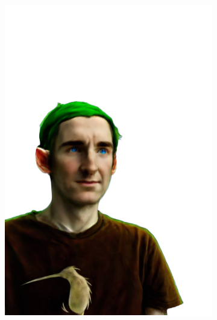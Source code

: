 \begin{figure}[ht]
\begin{subfigure}{0.08\linewidth}
        \includegraphics[width=\textwidth]{Figures/results/high/simon_elf/11_render.png}
	\end{subfigure}
    \begin{subfigure}{0.08\linewidth}%

\end{subfigure}
\end{figure}
